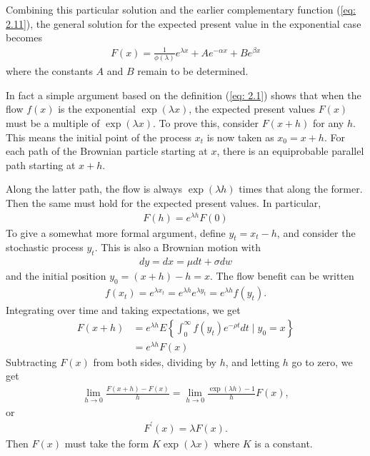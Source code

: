 \documentclass[\topdir/lecture\_notes.tex]{subfiles}
\begin{document}
\begin{optional}
Combining this particular solution and the earlier complementary function (\ref{eq: 2.11}), the general solution for the expected present value in the exponential case becomes
\begin{align}
F(x)=\frac{1}{\phi(\lambda)} e^{\lambda x}+A e^{-\alpha x}+B e^{\beta x} \label{eq: 2.12}
\end{align}
where the constants $A$ and $B$ remain to be determined.

In fact a simple argument based on the definition (\ref{eq: 2.1}) shows that when the flow $f(x)$ is the exponential $\exp (\lambda x)$, the expected present values $F(x)$ must be a multiple of $\exp (\lambda x)$. To prove this, consider $F(x+h)$ for any $h$. This means the initial point of the process $x_{t}$ is now taken as $x_{0}=x+h$. For each path of the Brownian particle starting at $x$, there is an equiprobable parallel path starting at $x+h$.

Along the latter path, the flow is always $\exp (\lambda h)$ times that along the former. Then the same must hold for the expected present values. In particular,
\begin{align*}
F(h)=e^{\lambda h} F(0)
\end{align*}
To give a somewhat more formal argument, define $y_{t}=x_{t}-h$, and consider the stochastic process $y_{t}$. This is also a Brownian motion with
\begin{align*}
d y=dx=\mu dt+\sigma dw
\end{align*}
and the initial position $y_{0}=(x+h)-h=x$. The flow benefit can be written
\begin{align*}
f(x_{t})=e^{\lambda x_{t}}=e^{\lambda h} e^{\lambda y_{t}}=e^{\lambda h} f\left(y_{t}\right).
\end{align*}
Integrating over time and taking expectations, we get
\begin{align*}
F(x+h) & =e^{\lambda h} E\left\{\int_{0}^{\infty} f\left(y_{t}\right) e^{-\rho t} dt \mid y_{0}=x\right\} \\
& =e^{\lambda h} F(x)
\end{align*}
Subtracting $F(x)$ from both sides, dividing by $h$, and letting $h$ go to zero, we get
\begin{align*}
\lim _{h \rightarrow 0} \frac{F(x+h)-F(x)}{h}=\lim _{h \rightarrow 0} \frac{\exp (\lambda h)-1}{h} F(x),
\end{align*}
or
\begin{align*}
F^{\prime}(x)=\lambda F(x).
\end{align*}
Then $F(x)$ must take the form $K \exp (\lambda x)$ where $K$ is a constant.


\end{optional}
\end{document}
